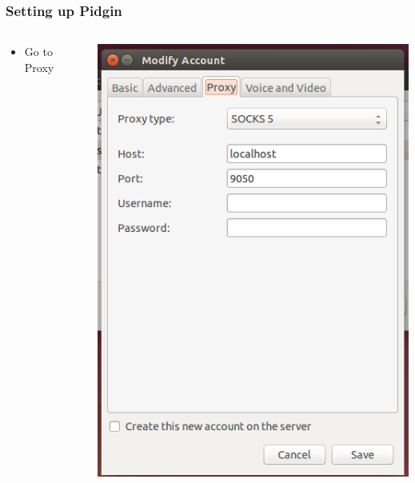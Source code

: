 \documentclass{beamer}
\begin{document}
\begin{frame}
\frametitle{Setting up Pidgin}
\begin{columns}
    \begin{column}{0.48\textwidth}
        \begin{itemize}
          \item Go to Proxy
        \end{itemize}
    \end{column}
    \begin{column}{.5\textwidth}
        \includegraphics[width=.9\linewidth]{pidgin_proxy}
    \end{column}
\end{columns}
\end{frame}
\end{document}
